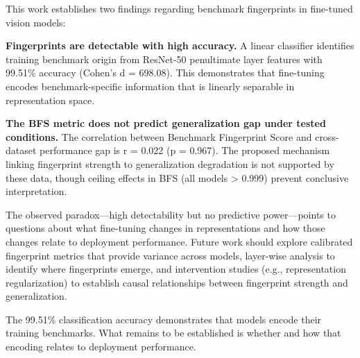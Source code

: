 
This work establishes two findings regarding benchmark fingerprints in fine-tuned vision models:

\textbf{Fingerprints are detectable with high accuracy.} A linear classifier identifies training benchmark origin from ResNet-50 penultimate layer features with 99.51\% accuracy (Cohen's d = 698.08). This demonstrates that fine-tuning encodes benchmark-specific information that is linearly separable in representation space.

\textbf{The BFS metric does not predict generalization gap under tested conditions.} The correlation between Benchmark Fingerprint Score and cross-dataset performance gap is r = 0.022 (p = 0.967). The proposed mechanism linking fingerprint strength to generalization degradation is not supported by these data, though ceiling effects in BFS (all models > 0.999) prevent conclusive interpretation.

The observed paradox---high detectability but no predictive power---points to questions about what fine-tuning changes in representations and how those changes relate to deployment performance. Future work should explore calibrated fingerprint metrics that provide variance across models, layer-wise analysis to identify where fingerprints emerge, and intervention studies (e.g., representation regularization) to establish causal relationships between fingerprint strength and generalization.

The 99.51\% classification accuracy demonstrates that models encode their training benchmarks. What remains to be established is whether and how that encoding relates to deployment performance.

